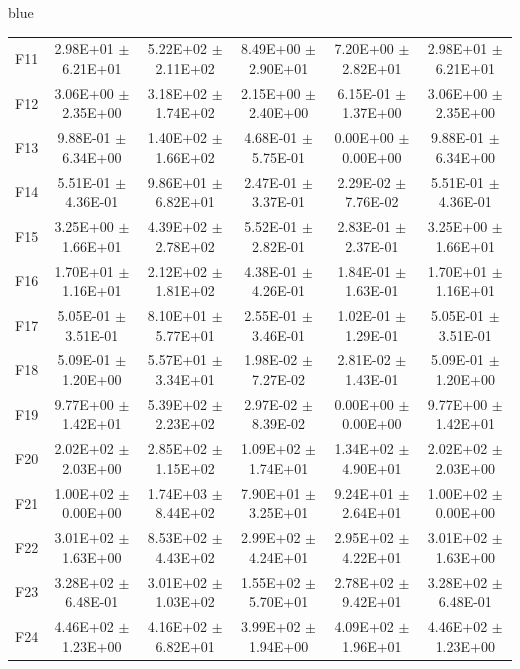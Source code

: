 \documentclass[journal, onecolumn]{IEEEtran}
\begin{document}
\begin{color}{blue}
\begin{table}[htbp!]
\begin{tabular}{c|ccccc}
			F11	 &	2.98E+01	$\pm$	6.21E+01	 &	5.22E+02	$\pm$	2.11E+02		 &	8.49E+00	$\pm$	2.90E+01		 &	7.20E+00	$\pm$	2.82E+01		 &	2.98E+01	$\pm$	6.21E+01	\\		
			F12	 &	3.06E+00	$\pm$	2.35E+00	 &	3.18E+02	$\pm$	1.74E+02		 &	2.15E+00	$\pm$	2.40E+00		 &	6.15E-01	$\pm$	1.37E+00		 &	3.06E+00	$\pm$	2.35E+00	\\		
			F13	 &	9.88E-01	$\pm$	6.34E+00	 &	1.40E+02	$\pm$	1.66E+02		 &	4.68E-01	$\pm$	5.75E-01		 &	0.00E+00	$\pm$	0.00E+00		 &	9.88E-01	$\pm$	6.34E+00	\\		
			F14	 &	5.51E-01	$\pm$	4.36E-01	 &	9.86E+01	$\pm$	6.82E+01		 &	2.47E-01	$\pm$	3.37E-01		 &	2.29E-02	$\pm$	7.76E-02		 &	5.51E-01	$\pm$	4.36E-01	\\		
			F15	 &	3.25E+00	$\pm$	1.66E+01	 &	4.39E+02	$\pm$	2.78E+02		 &	5.52E-01	$\pm$	2.82E-01		 &	2.83E-01	$\pm$	2.37E-01		 &	3.25E+00	$\pm$	1.66E+01	\\		
			F16	 &	1.70E+01	$\pm$	1.16E+01	 &	2.12E+02	$\pm$	1.81E+02		 &	4.38E-01	$\pm$	4.26E-01		 &	1.84E-01	$\pm$	1.63E-01		 &	1.70E+01	$\pm$	1.16E+01	\\		
			F17	 &	5.05E-01	$\pm$	3.51E-01	 &	8.10E+01	$\pm$	5.77E+01		 &	2.55E-01	$\pm$	3.46E-01		 &	1.02E-01	$\pm$	1.29E-01		 &	5.05E-01	$\pm$	3.51E-01	\\		
			F18	 &	5.09E-01	$\pm$	1.20E+00	 &	5.57E+01	$\pm$	3.34E+01		 &	1.98E-02	$\pm$	7.27E-02		 &	2.81E-02	$\pm$	1.43E-01		 &	5.09E-01	$\pm$	1.20E+00	\\		
			F19	 &	9.77E+00	$\pm$	1.42E+01	 &	5.39E+02	$\pm$	2.23E+02		 &	2.97E-02	$\pm$	8.39E-02		 &	0.00E+00	$\pm$	0.00E+00		 &	9.77E+00	$\pm$	1.42E+01	\\		
			F20	 &	2.02E+02	$\pm$	2.03E+00	 &	2.85E+02	$\pm$	1.15E+02		 &	1.09E+02	$\pm$	1.74E+01		 &	1.34E+02	$\pm$	4.90E+01		 &	2.02E+02	$\pm$	2.03E+00	\\		
			F21	 &	1.00E+02	$\pm$	0.00E+00	 &	1.74E+03	$\pm$	8.44E+02		 &	7.90E+01	$\pm$	3.25E+01		 &	9.24E+01	$\pm$	2.64E+01		 &	1.00E+02	$\pm$	0.00E+00	\\		
			F22	 &	3.01E+02	$\pm$	1.63E+00	 &	8.53E+02	$\pm$	4.43E+02		 &	2.99E+02	$\pm$	4.24E+01		 &	2.95E+02	$\pm$	4.22E+01		 &	3.01E+02	$\pm$	1.63E+00	\\		
			F23	 &	3.28E+02	$\pm$	6.48E-01	 &	3.01E+02	$\pm$	1.03E+02		 &	1.55E+02	$\pm$	5.70E+01		 &	2.78E+02	$\pm$	9.42E+01		 &	3.28E+02	$\pm$	6.48E-01	\\		
			F24	 &	4.46E+02	$\pm$	1.23E+00	 &	4.16E+02	$\pm$	6.82E+01		 &	3.99E+02	$\pm$	1.94E+00		 &	4.09E+02	$\pm$	1.96E+01		 &	4.46E+02	$\pm$	1.23E+00	\\		

\end{tabular}
\end{table}
\end{color}
\end{document}
